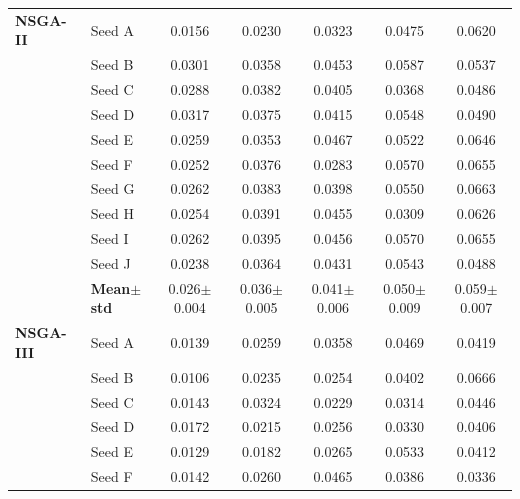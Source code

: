 \begin{table}[H]
{\begin{tabular}{@{}llccccc@{}}
\midrule
 \textbf{NSGA-II} & Seed A & {\small 0.0156} & {\small 0.0230} & {\small 0.0323} & {\small 0.0475} & {\small 0.0620} \\
  & Seed B & {\small 0.0301} & {\small 0.0358} & {\small 0.0453} & {\small 0.0587} & {\small 0.0537} \\
  & Seed C & {\small 0.0288} & {\small 0.0382} & {\small 0.0405} & {\small 0.0368} & {\small 0.0486} \\
  & Seed D & {\small 0.0317} & {\small 0.0375} & {\small 0.0415} & {\small 0.0548} & {\small 0.0490} \\
  & Seed E & {\small 0.0259} & {\small 0.0353} & {\small 0.0467} & {\small 0.0522} & {\small 0.0646} \\
  & Seed F & {\small 0.0252} & {\small 0.0376} & {\small 0.0283} & {\small 0.0570} & {\small 0.0655} \\
  & Seed G & {\small 0.0262} & {\small 0.0383} & {\small 0.0398} & {\small 0.0550} & {\small 0.0663} \\
  & Seed H & {\small 0.0254} & {\small 0.0391} & {\small 0.0455} & {\small 0.0309} & {\small 0.0626} \\
  & Seed I & {\small 0.0262} & {\small 0.0395} & {\small 0.0456} & {\small 0.0570} & {\small 0.0655} \\
  & Seed J & {\small 0.0238} & {\small 0.0364} & {\small 0.0431} & {\small 0.0543} & {\small 0.0488} \\
 & \textbf{Mean$\pm$std} & \cellcolor{ForestGreen!25}0.026$\pm$0.004 & \cellcolor{ForestGreen!25}0.036$\pm$0.005 & \cellcolor{ForestGreen!25}0.041$\pm$0.006 & \cellcolor{ForestGreen!25}0.050$\pm$0.009 & \cellcolor{ForestGreen!25}0.059$\pm$0.007 \\
\midrule
 \textbf{NSGA-III} & Seed A & {\small 0.0139} & {\small 0.0259} & {\small 0.0358} & {\small 0.0469} & {\small 0.0419} \\
  & Seed B & {\small 0.0106} & {\small 0.0235} & {\small 0.0254} & {\small 0.0402} & {\small 0.0666} \\
  & Seed C & {\small 0.0143} & {\small 0.0324} & {\small 0.0229} & {\small 0.0314} & {\small 0.0446} \\
  & Seed D & {\small 0.0172} & {\small 0.0215} & {\small 0.0256} & {\small 0.0330} & {\small 0.0406} \\
  & Seed E & {\small 0.0129} & {\small 0.0182} & {\small 0.0265} & {\small 0.0533} & {\small 0.0412} \\
  & Seed F & {\small 0.0142} & {\small 0.0260} & {\small 0.0465} & {\small 0.0386} & {\small 0.0336} \\

\end{tabular}}
\end{table}
